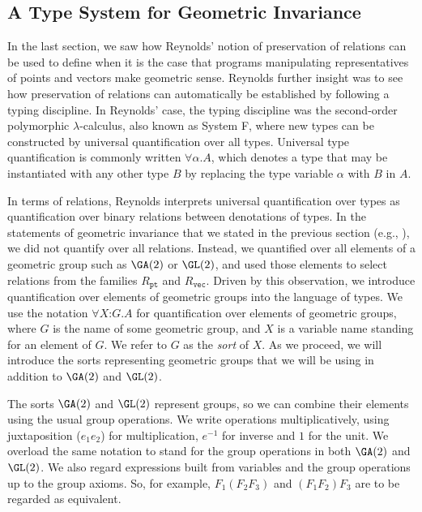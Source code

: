 \subsection{A Type System for Geometric Invariance}
\label{sec:type-system-geom-intro}

In the last section, we saw how Reynolds' notion of preservation of
relations can be used to define when it is the case that programs
manipulating representatives of points and vectors make geometric
sense. Reynolds further insight was to see how preservation of
relations can automatically be established by following a typing
discipline. In Reynolds' case, the typing discipline was the
second-order polymorphic $\lambda$-calculus, also known as System F,
where new types can be constructed by universal quantification over
all types. Universal type quantification is commonly written $\forall
\alpha. A$, which denotes a type that may be instantiated with any
other type $B$ by replacing the type variable $\alpha$ with $B$ in
$A$.

In terms of relations, Reynolds interprets universal quantification
over types as quantification over binary relations between denotations
of types. In the statements of geometric invariance that we stated in
the previous section (e.g., ), we
did not quantify over all relations. Instead, we quantified over all
elements of a geometric group such as $\GA(2)$ or $\GL(2)$, and used
those elements to select relations from the families $R_{\texttt{pt}}$
and $R_{\texttt{vec}}$. Driven by this observation, we introduce
quantification over elements of geometric groups into the language of
types. We use the notation $\forall X \mathord: G. A$ for
quantification over elements of geometric groups, where $G$ is the
name of some geometric group, and $X$ is a variable name standing for
an element of $G$. We refer to $G$ as the \emph{sort} of $X$. As we
proceed, we will introduce the sorts representing geometric groups
that we will be using in addition to $\GA(2)$ and $\GL(2)$.

The sorts $\GA(2)$ and $\GL(2)$ represent groups, so we can combine
their elements using the usual group operations. We write operations
multiplicatively, using juxtaposition ($e_1e_2$) for multiplication,
$e^{-1}$ for inverse and $1$ for the unit. We overload the same
notation to stand for the group operations in both $\GA(2)$ and
$\GL(2)$. We also regard expressions built from variables and the
group operations up to the group axioms. So, for example,
$F_1(F_2F_3)$ and $(F_1F_2)F_3$ are to be regarded as equivalent.

